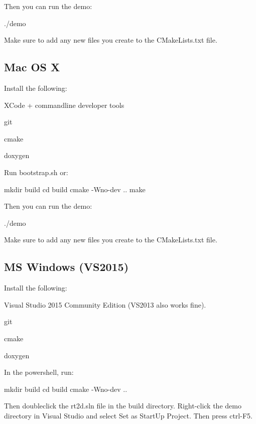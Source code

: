 Then you can run the demo\+: \begin{DoxyVerb}./demo
\end{DoxyVerb}


Make sure to add any new files you create to the {\ttfamily C\+Make\+Lists.\+txt} file.

\subsection*{Mac OS X }

Install the following\+:


\begin{DoxyItemize}
\item X\+Code + commandline developer tools
\item git
\item cmake
\item doxygen
\end{DoxyItemize}

Run {\ttfamily bootstrap.\+sh} or\+: \begin{DoxyVerb}mkdir build
cd build
cmake -Wno-dev ..
make
\end{DoxyVerb}


Then you can run the demo\+: \begin{DoxyVerb}./demo
\end{DoxyVerb}


Make sure to add any new files you create to the {\ttfamily C\+Make\+Lists.\+txt} file.

\subsection*{MS Windows (V\+S2015) }

Install the following\+:


\begin{DoxyItemize}
\item Visual Studio 2015 Community Edition (V\+S2013 also works fine).
\item git
\item cmake
\item doxygen
\end{DoxyItemize}

In the powershell, run\+: \begin{DoxyVerb}mkdir build
cd build
cmake -Wno-dev ..
\end{DoxyVerb}


Then doubleclick the {\ttfamily rt2d.\+sln} file in the {\ttfamily build} directory. Right-\/click the \textquotesingle{}demo\textquotesingle{} directory in Visual Studio and select \textquotesingle{}Set as Start\+Up Project\textquotesingle{}. Then press ctrl-\/\+F5.

